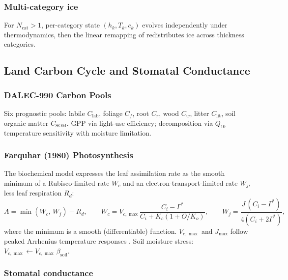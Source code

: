 \documentclass[11pt,a4paper]{article}
\begin{document}
\subsubsection{Multi-category ice}

For $N_{\mathrm{cat}}>1$, per-category state $(h_k,T_k,c_k)$ evolves independently under thermodynamics, then the linear remapping of \citet{Lipscomb2001} redistributes ice across thickness categories.

\subsection{Land Carbon Cycle and Stomatal Conductance}

\subsubsection{DALEC-990 Carbon Pools}
Six prognostic pools: labile $C_{\mathrm{lab}}$, foliage $C_f$, root $C_r$, wood $C_w$, litter $C_{\mathrm{lit}}$, soil organic matter $C_{\mathrm{SOM}}$.  GPP via light-use efficiency; decomposition via $Q_{10}$ temperature sensitivity with moisture limitation.

\subsubsection{Farquhar (1980) Photosynthesis}
The \citet{Farquhar1980} biochemical model expresses the leaf
assimilation rate as the smooth minimum of a Rubisco-limited rate
$W_c$ and an electron-transport-limited rate $W_j$, less leaf
respiration $R_d$:
\begin{equation}
  A = \min(W_c,\, W_j) - R_d, \qquad
  W_c = V_{c,\max}\frac{C_i - \Gamma^*}{C_i + K_c(1+O/K_o)}, \qquad
  W_j = \frac{J\,(C_i - \Gamma^*)}{4(C_i + 2\Gamma^*)},
\end{equation}
where the minimum is a smooth (differentiable) function.  $V_{c,\max}$ and $J_{\max}$ follow peaked Arrhenius temperature responses \citep{Bernacchi2001}.  Soil moisture stress: $V_{c,\max}\leftarrow V_{c,\max}\,\beta_{\mathrm{soil}}$.

\subsubsection{Stomatal conductance}
\end{document}
